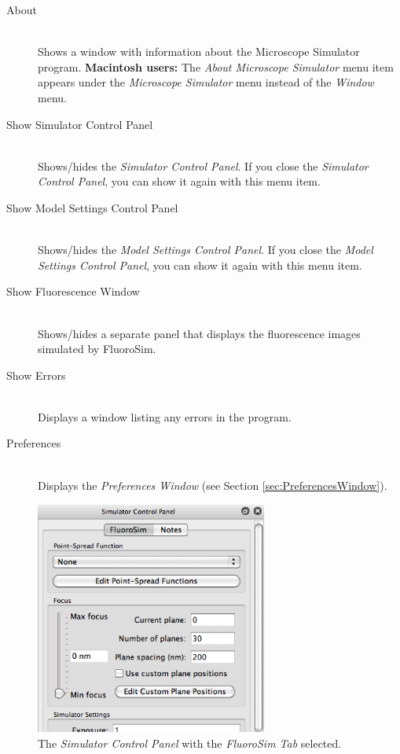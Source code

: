 \documentclass[11pt,titlepage]{article}
\begin{document}
\begin{description}

  \item[About] \hfill \\
  Shows a window with information about the Microscope Simulator program. \textbf{Macintosh users:} The \emph{About Microscope Simulator} menu item appears under the \emph{Microscope Simulator} menu instead of the \emph{Window} menu. 

  \item[Show Simulator Control Panel] \hfill \\
  Shows/hides the \emph{Simulator Control Panel}. If you close the \emph{Simulator Control Panel}, you can show it again with this menu item.
  
  \item[Show Model Settings Control Panel] \hfill \\
    Shows/hides the \emph{Model Settings Control Panel}. If you close the \emph{Model Settings Control Panel}, you can show it again with this menu item.
  
  \item[Show Fluorescence Window] \hfill \\
  Shows/hides a separate panel that displays the fluorescence images simulated by FluoroSim.
  
  \item[Show Errors] \hfill \\
  Displays a window listing any errors in the program.
  
  \item[Preferences] \hfill \\
  Displays the \emph{Preferences Window} (see Section \ref{sec:PreferencesWindow}).

\end{description}

\begin{figure}[htbp] %
   \centering
   \includegraphics[width=3in]{images/SimulatorControlPanel} 
   \caption{The \emph{Simulator Control Panel} with the \emph{FluoroSim Tab} selected.}
   \label{fig:SimulatorControlPanel}
\end{figure}
\end{document}
